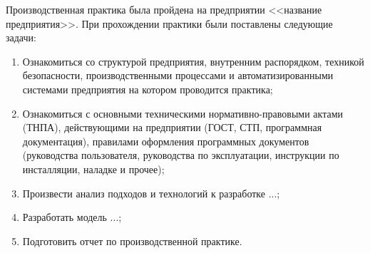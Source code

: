 \label{sec:practice:introduction}
Производственная практика была пройдена на предприятии <<название предприятия>>. При прохождении практики были поставлены следующие задачи:
\begin{enumerate}[label=\arabic*.]
    \item {Ознакомиться со структурой предприятия, внутренним распорядком, техникой безопасности, производственными процессами и автоматизированными системами предприятия на котором проводится практика;}
    \item{Ознакомиться с основными техническими нормативно-правовыми актами (ТНПА), действующими на предприятии (ГОСТ, СТП, программная документация), правилами  оформления программных документов (руководства пользователя, руководства по эксплуатации, инструкции по инсталляции, наладке и прочее);}
    \item{Произвести анализ подходов и технологий к разработке ...;} %
    \item{Разработать модель ...;} %
    \item{Подготовить отчет по производственной практике.}
\end{enumerate}